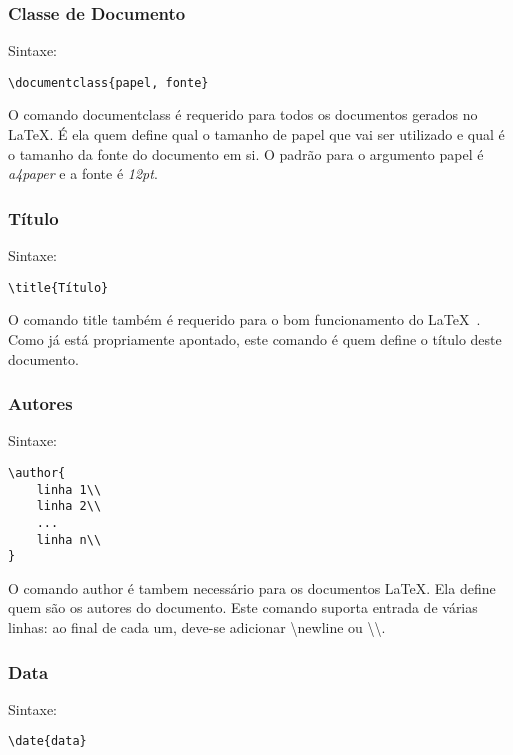 \documentclass[a4paper,12pt]{article}
\begin{document}
\subsubsection{Classe de Documento}
\hspace{2cm}Sintaxe:
\begin{verbatim}
\documentclass{papel, fonte}
\end{verbatim}

\hspace{2cm}O comando documentclass é requerido para todos os documentos gerados no \LaTeX. É ela quem define qual o tamanho de papel que vai ser utilizado e qual é o tamanho da fonte do documento em si. O padrão para o argumento papel é \textit{a4paper} e a fonte é \textit{12pt}.

\subsubsection{Título}
\hspace{2cm}Sintaxe:
\begin{verbatim}
\title{Título}
\end{verbatim}

\hspace{2cm}O comando title também é requerido para o bom funcionamento do \LaTeX\ . Como já está propriamente apontado, este comando é quem define o título deste documento.

\subsubsection{Autores}
\hspace{2cm}Sintaxe:
\begin{verbatim}
\author{
	linha 1\\
	linha 2\\
	...
	linha n\\
}
\end{verbatim}

\hspace{2cm}O comando author é tambem necessário para os documentos \LaTeX. Ela define quem são os autores do documento.
Este comando suporta entrada de várias linhas: ao final de cada um, deve-se adicionar \textbackslash newline ou \textbackslash \textbackslash .

\subsubsection{Data}
\hspace{2cm}Sintaxe:
\begin{verbatim}
\date{data}
\end{verbatim}
\end{document}
